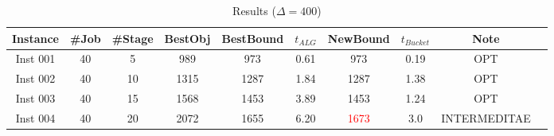 \documentclass[11pt]{article}
\begin{document}
\begin{table}[ht]
    \centering
    \begin{tabular}{c|c|c|c|c|c||c|c|c|c}
        Instance & \#Job & \#Stage & BestObj & BestBound & $t_{ALG}$ & NewBound & $t_{Bucket}$ & Note \\
        \midrule
        Inst 001 & 40 & 5 & 989 & 973 & 0.61 & 973 & 0.19 & OPT \\
        Inst 002 & 40 & 10 & 1315 & 1287 & 1.84 & 1287 & 1.38 & OPT \\
        Inst 003 & 40 & 15 & 1568 & 1453 & 3.89 & 1453 & 1.24 & OPT \\
        Inst 004 & 40 & 20 & 2072 & 1655 & 6.20 & \textcolor{red}{1673} & 3.0 & INTERMEDITAE\\
    \end{tabular}
    \caption{Results ($\Delta = 400$)}
    \label{tab:placeholder}
\end{table}
\end{document}
